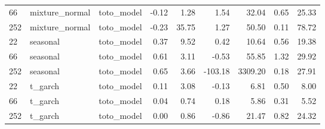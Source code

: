 {\begin{tabular}{lllrrrrrr}
66 & mixture\_normal & toto\_model & -0.12 & 1.28 & 1.54 & 32.04 & 0.65 & 25.33 \\
252 & mixture\_normal & toto\_model & -0.23 & 35.75 & 1.27 & 50.50 & 0.11 & 78.72 \\
\midrule
22 & seasonal & toto\_model & 0.37 & 9.52 & 0.42 & 10.64 & 0.56 & 19.38 \\
66 & seasonal & toto\_model & 0.61 & 3.11 & -0.53 & 55.85 & 1.32 & 29.92 \\
252 & seasonal & toto\_model & 0.65 & 3.66 & -103.18 & 3309.20 & 0.18 & 27.91 \\
\midrule
22 & t\_garch & toto\_model & 0.11 & 3.08 & -0.13 & 6.81 & 0.50 & 8.00 \\
66 & t\_garch & toto\_model & 0.04 & 0.74 & 0.18 & 5.86 & 0.31 & 5.52 \\
252 & t\_garch & toto\_model & 0.00 & 0.86 & -0.86 & 21.47 & 0.82 & 24.32 \\
\bottomrule
\end{tabular}
}
